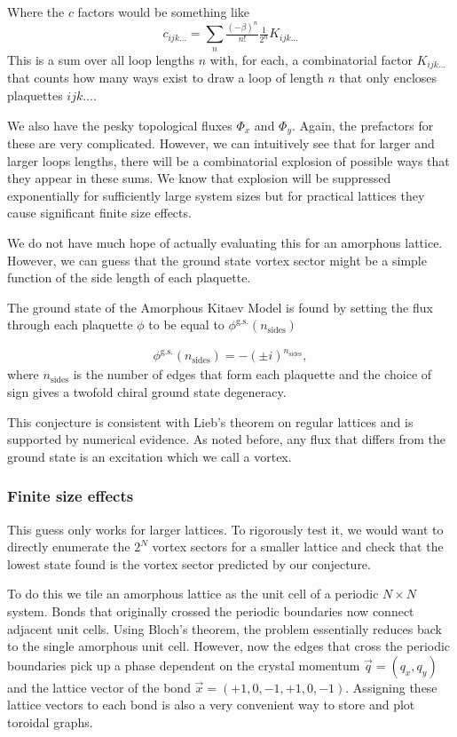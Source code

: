 Where the \(c\) factors would be something like \[c_{ijk...} = \sum_n \tfrac{(-\beta)^n}{n!} \tfrac{1}{2^n} K_{ijk...}\] This is a sum over all loop lengths \(n\) with, for each, a combinatorial factor \(K_{ijk...}\) that counts how many ways exist to draw a loop of length \(n\) that only encloses plaquettes \(ijk...\).

We also have the pesky topological fluxes \(\Phi_x\) and \(\Phi_y\). Again, the prefactors for these are very complicated. However, we can intuitively see that for larger and larger loops lengths, there will be a combinatorial explosion of possible ways that they appear in these sums. We know that explosion will be suppressed exponentially for sufficiently large system sizes but for practical lattices they cause significant finite size effects.

We do not have much hope of actually evaluating this for an amorphous lattice. However, we can guess that the ground state vortex sector might be a simple function of the side length of each plaquette.

The ground state of the Amorphous Kitaev Model is found by setting the flux through each plaquette \(\phi\) to be equal to \(\phi^{\mathrm{g.s.}}(n_{\mathrm{sides}})\)

\[\begin{aligned}
    \phi^{\mathrm{g.s.}}(n_{\mathrm{sides}}) = -(\pm i)^{n_{\mathrm{sides}}},
\end{aligned}\] where \(n_{\mathrm{sides}}\) is the number of edges that form each plaquette and the choice of sign gives a twofold chiral ground state degeneracy.

This conjecture is consistent with Lieb's theorem on regular lattices \autocite{lieb_flux_1994} and is supported by numerical evidence. As noted before, any flux that differs from the ground state is an excitation which we call a vortex.

\hypertarget{finite-size-effects}{%
\subsubsection{Finite size effects}\label{finite-size-effects}}

This guess only works for larger lattices. To rigorously test it, we would want to directly enumerate the \(2^N\) vortex sectors for a smaller lattice and check that the lowest state found is the vortex sector predicted by our conjecture.

To do this we tile an amorphous lattice as the unit cell of a periodic \(N\times N\) system. Bonds that originally crossed the periodic boundaries now connect adjacent unit cells. Using Bloch's theorem, the problem essentially reduces back to the single amorphous unit cell. However, now the edges that cross the periodic boundaries pick up a phase dependent on the crystal momentum \(\vec{q} = (q_x, q_y)\) and the lattice vector of the bond \(\vec{x} = (+1, 0, -1, +1, 0, -1)\). Assigning these lattice vectors to each bond is also a very convenient way to store and plot toroidal graphs.

